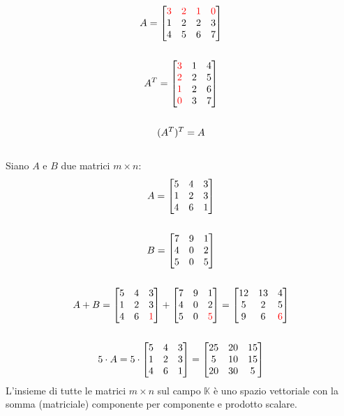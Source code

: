 \documentclass[italian]{article}
\begin{document}
\begin{gather*}
	A = 
	\begin{bmatrix} 
		\textcolor{red}{3} & \textcolor{red}{2} & \textcolor{red}{1} & \textcolor{red}{0} \\
		1 & 2 & 2 & 3 \\
		4 & 5 & 6 & 7
	\end{bmatrix}\\\\	
	A^T =
	\begin{bmatrix} 
		\textcolor{red}{3} & 1 & 4 \\
		\textcolor{red}{2} & 2 & 5 \\
		\textcolor{red}{1} & 2 & 6 \\
		\textcolor{red}{0} & 3 & 7
	\end{bmatrix}\\\\
	(A^T)^T = A
\end{gather*}\\
Siano $A$ e $B$ due matrici $m\times n$:
\begin{gather*}
	A = 
	\begin{bmatrix} 
		5 & 4 & 3 \\
		1 & 2 & 3 \\
		4 & 6 & 1
	\end{bmatrix}\\\\
	B = 
	\begin{bmatrix} 
		7 & 9 & 1 \\
		4 & 0 & 2 \\
		5 & 0 & 5
	\end{bmatrix}\\\\
	A+B =
	\begin{bmatrix} 
		5 & 4 & 3 \\
		1 & 2 & 3 \\
		4 & 6 & \textcolor{red}{1}
	\end{bmatrix}
	+
	\begin{bmatrix} 
		7 & 9 & 1 \\
		4 & 0 & 2 \\
		5 & 0 & \textcolor{red}{5}
	\end{bmatrix}
	=
	\begin{bmatrix} 
		12 & 13 & 4 \\
		5 & 2 & 5 \\
		9 & 6 & \textcolor{red}{6}
	\end{bmatrix}\\\\
	5\cdot A =
	5\cdot 
	\begin{bmatrix} 
	5 & 4 & 3 \\
	1 & 2 & 3 \\
	4 & 6 & 1
	\end{bmatrix}
	=
	\begin{bmatrix} 
	25 & 20 & 15 \\
	5 & 10 & 15 \\
	20 & 30 & 5
	\end{bmatrix}
\end{gather*}
L'insieme di tutte le matrici  $m\times n$ sul campo $\mathbb{K}$ è uno spazio vettoriale con la somma (matriciale) componente per componente e prodotto scalare. 
\end{document}
